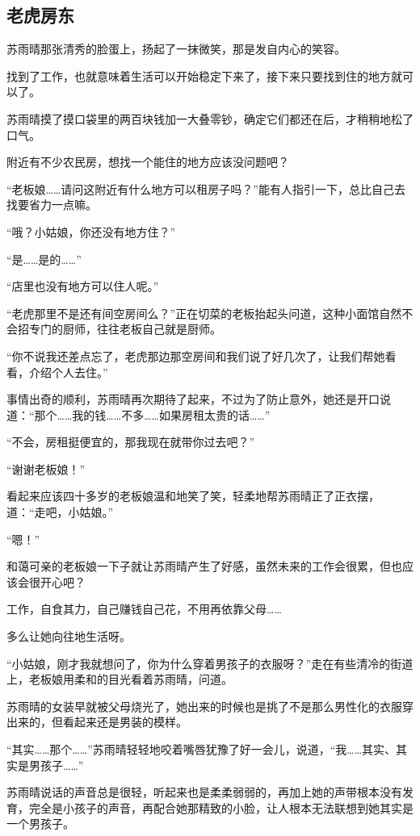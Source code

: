 \subsection{老虎房东}

苏雨晴那张清秀的脸蛋上，扬起了一抹微笑，那是发自内心的笑容。

找到了工作，也就意味着生活可以开始稳定下来了，接下来只要找到住的地方就可以了。

苏雨晴摸了摸口袋里的两百块钱加一大叠零钞，确定它们都还在后，才稍稍地松了口气。

附近有不少农民房，想找一个能住的地方应该没问题吧？

“老板娘……请问这附近有什么地方可以租房子吗？”能有人指引一下，总比自己去找要省力一点嘛。

“哦？小姑娘，你还没有地方住？”

“是……是的……”

“店里也没有地方可以住人呢。”

“老虎那里不是还有间空房间么？”正在切菜的老板抬起头问道，这种小面馆自然不会招专门的厨师，往往老板自己就是厨师。

“你不说我还差点忘了，老虎那边那空房间和我们说了好几次了，让我们帮她看看，介绍个人去住。”

事情出奇的顺利，苏雨晴再次期待了起来，不过为了防止意外，她还是开口说道：“那个……我的钱……不多……如果房租太贵的话……”

“不会，房租挺便宜的，那我现在就带你过去吧？”

“谢谢老板娘！”

看起来应该四十多岁的老板娘温和地笑了笑，轻柔地帮苏雨晴正了正衣摆，道：“走吧，小姑娘。”

“嗯！”

和蔼可亲的老板娘一下子就让苏雨晴产生了好感，虽然未来的工作会很累，但也应该会很开心吧？

工作，自食其力，自己赚钱自己花，不用再依靠父母……

多么让她向往地生活呀。

“小姑娘，刚才我就想问了，你为什么穿着男孩子的衣服呀？”走在有些清冷的街道上，老板娘用柔和的目光看着苏雨晴，问道。

苏雨晴的女装早就被父母烧光了，她出来的时候也是挑了不是那么男性化的衣服穿出来的，但看起来还是男装的模样。

“其实……那个……”苏雨晴轻轻地咬着嘴唇犹豫了好一会儿，说道，“我……其实、其实是男孩子……”

苏雨晴说话的声音总是很轻，听起来也是柔柔弱弱的，再加上她的声带根本没有发育，完全是小孩子的声音，再配合她那精致的小脸，让人根本无法联想到她其实是一个男孩子。


